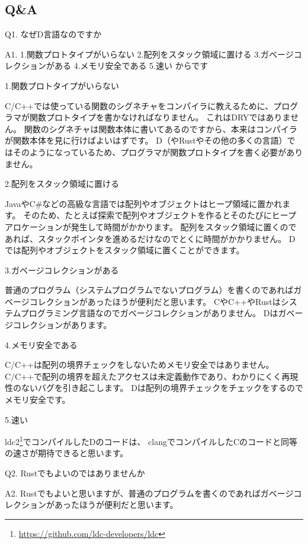 \documentclass[11pt,a4paper]{ltjsarticle}
\begin{document}
\subsection{Q\&A}


Q1. なぜD言語なのですか

A1. 1.関数プロトタイプがいらない 2.配列をスタック領域に置ける 3.ガベージコレクションがある 4.メモリ安全である 5.速い からです

\medskip 1.関数プロトタイプがいらない

C/C++では使っている関数のシグネチャをコンパイラに教えるために、プログラマが関数プロトタイプを書かなければなりません。
これはDRYではありません。
関数のシグネチャは関数本体に書いてあるのですから、本来はコンパイラが関数本体を見に行けばよいはずです。
D（やRustやその他の多くの言語）ではそのようになっているため、プログラマが関数プロトタイプを書く必要がありません。

\medskip 2.配列をスタック領域に置ける

JavaやC\#などの高級な言語では配列やオブジェクトはヒープ領域に置かれます。
そのため、たとえば探索で配列やオブジェクトを作るとそのたびにヒープアロケーションが発生して時間がかかります。
配列をスタック領域に置くのであれば、スタックポインタを進めるだけなのでとくに時間がかかりません。
Dでは配列やオブジェクトをスタック領域に置くことができます。

\medskip 3.ガベージコレクションがある

普通のプログラム（システムプログラムでないプログラム）を書くのであればガベージコレクションがあったほうが便利だと思います。
CやC++やRustはシステムプログラミング言語なのでガベージコレクションがありません。
Dはガベージコレクションがあります。

\medskip 4.メモリ安全である

C/C++は配列の境界チェックをしないためメモリ安全ではありません。
C/C++で配列の境界を超えたアクセスは未定義動作であり、わかりにくく再現性のないバグを引き起こします。
Dは配列の境界チェックをチェックをするのでメモリ安全です。

\medskip 5.速い

ldc2\footnote{\url{https://github.com/ldc-developers/ldc}}でコンパイルしたDのコードは、
clangでコンパイルしたCのコードと同等の速さが期待できると思います。

\bigskip Q2. Rustでもよいのではありませんか

A2. Rustでもよいと思いますが、普通のプログラムを書くのであればガベージコレクションがあったほうが便利だと思います。
\end{document}
